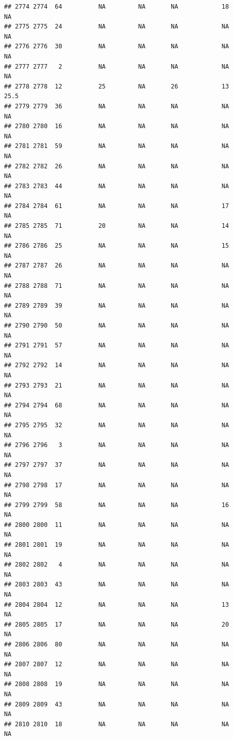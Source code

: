 \documentclass[man]{apa6}
\begin{document}
\begin{verbatim}
## 2774 2774  64          NA         NA       NA            18       NA
## 2775 2775  24          NA         NA       NA            NA       NA
## 2776 2776  30          NA         NA       NA            NA       NA
## 2777 2777   2          NA         NA       NA            NA       NA
## 2778 2778  12          25         NA       26            13     25.5
## 2779 2779  36          NA         NA       NA            NA       NA
## 2780 2780  16          NA         NA       NA            NA       NA
## 2781 2781  59          NA         NA       NA            NA       NA
## 2782 2782  26          NA         NA       NA            NA       NA
## 2783 2783  44          NA         NA       NA            NA       NA
## 2784 2784  61          NA         NA       NA            17       NA
## 2785 2785  71          20         NA       NA            14       NA
## 2786 2786  25          NA         NA       NA            15       NA
## 2787 2787  26          NA         NA       NA            NA       NA
## 2788 2788  71          NA         NA       NA            NA       NA
## 2789 2789  39          NA         NA       NA            NA       NA
## 2790 2790  50          NA         NA       NA            NA       NA
## 2791 2791  57          NA         NA       NA            NA       NA
## 2792 2792  14          NA         NA       NA            NA       NA
## 2793 2793  21          NA         NA       NA            NA       NA
## 2794 2794  68          NA         NA       NA            NA       NA
## 2795 2795  32          NA         NA       NA            NA       NA
## 2796 2796   3          NA         NA       NA            NA       NA
## 2797 2797  37          NA         NA       NA            NA       NA
## 2798 2798  17          NA         NA       NA            NA       NA
## 2799 2799  58          NA         NA       NA            16       NA
## 2800 2800  11          NA         NA       NA            NA       NA
## 2801 2801  19          NA         NA       NA            NA       NA
## 2802 2802   4          NA         NA       NA            NA       NA
## 2803 2803  43          NA         NA       NA            NA       NA
## 2804 2804  12          NA         NA       NA            13       NA
## 2805 2805  17          NA         NA       NA            20       NA
## 2806 2806  80          NA         NA       NA            NA       NA
## 2807 2807  12          NA         NA       NA            NA       NA
## 2808 2808  19          NA         NA       NA            NA       NA
## 2809 2809  43          NA         NA       NA            NA       NA
## 2810 2810  18          NA         NA       NA            NA       NA

\end{verbatim}
\end{document}
